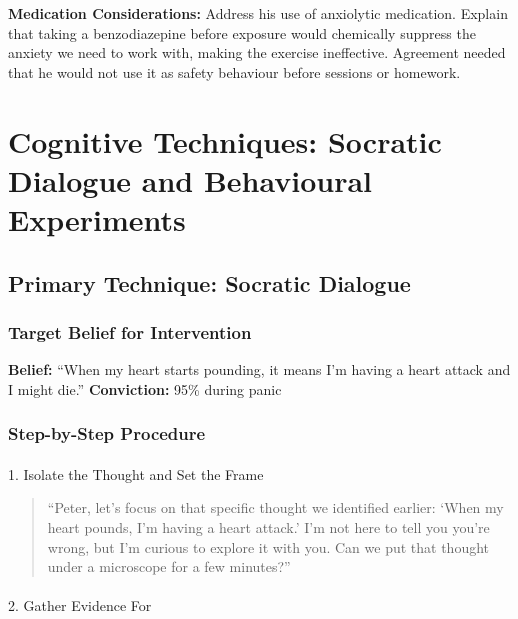 \documentclass[
  american,
  letterpaper,
  DIV=11,
  numbers=noendperiod]{scrartcl}
\makeatletter
\let\oldparagraph\paragraph
\renewcommand{\paragraph}{
    \@ifstar
      \xxxParagraphStar
      \xxxParagraphNoStar
  }
\newcommand{\xxxParagraphStar}[1]{\oldparagraph*{#1}\mbox{}}
\newcommand{\xxxParagraphNoStar}[1]{\oldparagraph{#1}\mbox{}}
\makeatother
\begin{document}
\textbf{Medication Considerations:} Address his use of anxiolytic
medication. Explain that taking a benzodiazepine before exposure would
chemically suppress the anxiety we need to work with, making the
exercise ineffective. Agreement needed that he would not use it as
safety behaviour before sessions or homework.

\section{Cognitive Techniques: Socratic Dialogue and Behavioural
Experiments}\label{cognitive-techniques-socratic-dialogue-and-behavioural-experiments}

\subsection{Primary Technique: Socratic
Dialogue}\label{primary-technique-socratic-dialogue}

\subsubsection{Target Belief for
Intervention}\label{target-belief-for-intervention}

\textbf{Belief:} ``When my heart starts pounding, it means I'm having a
heart attack and I might die.'' \textbf{Conviction:} 95\% during panic

\subsubsection{Step-by-Step Procedure}\label{step-by-step-procedure}

\paragraph{1. Isolate the Thought and Set the
Frame}\label{isolate-the-thought-and-set-the-frame}

\begin{quote}
``Peter, let's focus on that specific thought we identified earlier:
`When my heart pounds, I'm having a heart attack.' I'm not here to tell
you you're wrong, but I'm curious to explore it with you. Can we put
that thought under a microscope for a few minutes?''
\end{quote}

\paragraph{2. Gather Evidence For}\label{gather-evidence-for}
\end{document}
